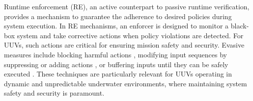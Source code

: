 Runtime enforcement (RE), an active counterpart to passive runtime verification, provides a mechanism to guarantee the adherence to desired policies during system execution. In RE mechanisms, an enforcer is designed to monitor a black-box system and take corrective actions when policy violations are detected. For UUVs, such actions are critical for ensuring mission safety and security. Evasive measures include blocking harmful actions \cite{enforceablesecpol}, modifying input sequences by suppressing or adding actions \cite{RuntimeNonSafety}, or buffering inputs until they can be safely executed \cite{FalconeMFR11,FMSD}. These techniques are particularly relevant for UUVs operating in dynamic and unpredictable underwater environments, where maintaining system safety and security is paramount.







